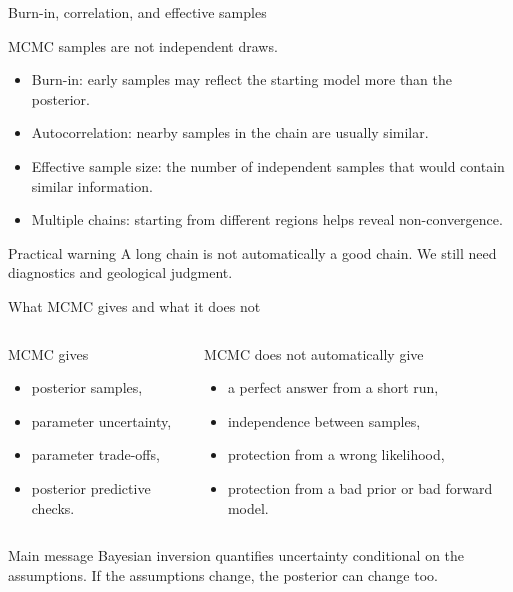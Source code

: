 \documentclass[aspectratio=169]{beamer}
\begin{document}
\begin{frame}{Burn-in, correlation, and effective samples}
\small

MCMC samples are not independent draws.

\begin{itemize}
    \item[--] \alert{Burn-in}: early samples may reflect the starting model more than the posterior.
    \item[--] \alert{Autocorrelation}: nearby samples in the chain are usually similar.
    \item[--] \alert{Effective sample size}: the number of independent samples that would contain similar information.
    \item[--] \alert{Multiple chains}: starting from different regions helps reveal non-convergence.
\end{itemize}

\begin{alertblock}{Practical warning}
A long chain is not automatically a good chain. We still need diagnostics and geological judgment.
\end{alertblock}
\end{frame}

\begin{frame}{What MCMC gives and what it does not}
\small

\begin{columns}[T]
\begin{block}{MCMC gives}
\begin{itemize}
    \item[--] posterior samples,
    \item[--] parameter uncertainty,
    \item[--] parameter trade-offs,
    \item[--] posterior predictive checks.
\end{itemize}
\end{block}

\begin{block}{MCMC does not automatically give}
\begin{itemize}
    \item[--] a perfect answer from a short run,
    \item[--] independence between samples,
    \item[--] protection from a wrong likelihood,
    \item[--] protection from a bad prior or bad forward model.
\end{itemize}
\end{block}
\end{columns}

\begin{alertblock}{Main message}
Bayesian inversion quantifies uncertainty conditional on the assumptions. If the assumptions change, the posterior can change too.
\end{alertblock}
\end{frame}
\end{document}
